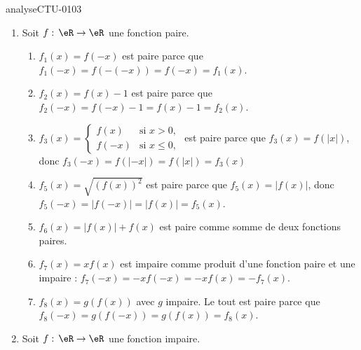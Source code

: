 
\begin{corrige}{analyseCTU-0103}

  \begin{enumerate}
  \item Soit $f:\,\eR\to\eR$ une fonction paire.
      \begin{enumerate}
          \item
            $f_1 (x) = f(-x)$  est paire parce que  $f_1 (-x) = f(-(-x)) = f(-x) = f_1(x)$.
        \item
            $f_2 (x) = f(x)-1$ est paire parce que $f_2 (-x) = f(-x)-1 =f(x)-1 = f_2(x)$.
        \item
            $f_3 (x)= 
            \begin{cases}
              f(x) &\text{si } x>0, \\
              f(-x)& \text{si } x\leq 0,
            \end{cases}$ est paire parce que  $f_3(x) = f(|x|)$, donc  $f_3(-x) = f(|-x|)= f(|x|) = f_3 (x)$
        \item
            $f_5(x) = \sqrt{(f(x))^2}$ est paire parce que $f_5(x) = |f(x)|$, donc  $f_5(-x) = |f(-x)| = |f(x)| = f_5(x)$.
        \item
            $f_6(x)= |f(x)| + f(x)$ est paire comme somme de deux fonctions paires.
        \item
            $f_7(x) = xf(x)$ est impaire comme produit d'une fonction paire et une impaire : $f_7(-x) = -xf(-x) = -xf(x) = -f_7(x)$.
        \item
            $f_8(x) = g(f(x))$ avec $g$ impaire. Le tout est paire parce que $f_8(-x) = g(f(-x))= g(f(x))=f_8(x)$.
      \end{enumerate}
\item  Soit $f:\,\eR\to\eR$ une fonction impaire.
\end{enumerate}
\end{corrige}
